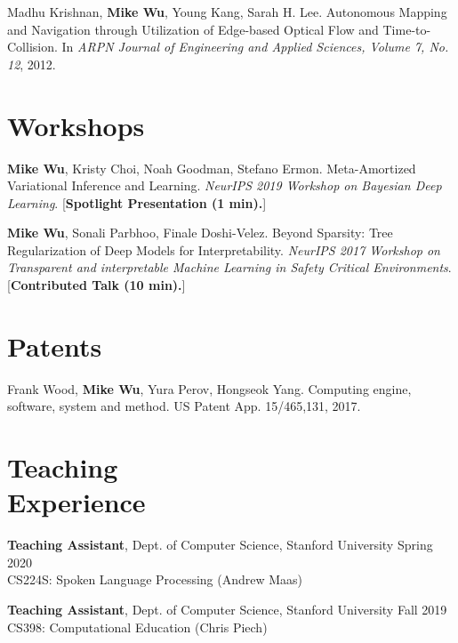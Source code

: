 \documentclass[margin, 10pt]{res} %
\begin{document}
\begin{resume}
Madhu Krishnan, \textbf{Mike Wu}, Young Kang, Sarah H. Lee. Autonomous Mapping and Navigation through Utilization of Edge-based Optical Flow and Time-to-Collision. In \textit{ARPN Journal of Engineering and Applied Sciences, Volume 7, No. 12}, 2012.

\section{Workshops}

\textbf{Mike Wu}, Kristy Choi, Noah Goodman, Stefano Ermon. Meta-Amortized Variational Inference and Learning. \textit{NeurIPS 2019 Workshop on Bayesian Deep Learning}. [\textbf{Spotlight Presentation (1 min).}]

\textbf{Mike Wu}, Sonali Parbhoo, Finale Doshi-Velez. Beyond Sparsity: Tree Regularization of Deep Models for Interpretability. \textit{NeurIPS 2017 Workshop on Transparent and interpretable Machine Learning in Safety Critical Environments}. [\textbf{Contributed Talk (10 min).}]


\section{Patents}

Frank Wood, \textbf{Mike Wu}, Yura Perov, Hongseok Yang. Computing engine, software, system and method. US Patent App. 15/465,131, 2017.


\section{Teaching \\ Experience}

\textbf{Teaching Assistant}, Dept. of Computer Science, Stanford University \hfill Spring 2020\\
CS224S: Spoken Language Processing (Andrew Maas)

\textbf{Teaching Assistant}, Dept. of Computer Science, Stanford University \hfill Fall 2019\\
CS398: Computational Education (Chris Piech)


\end{resume}
\end{document}
